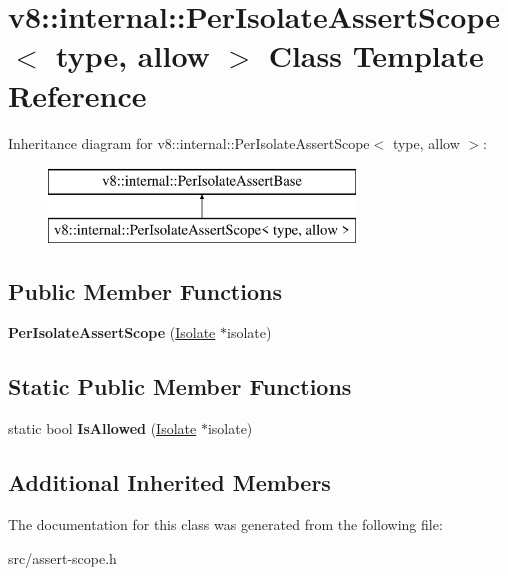 \hypertarget{classv8_1_1internal_1_1_per_isolate_assert_scope}{}\section{v8\+:\+:internal\+:\+:Per\+Isolate\+Assert\+Scope$<$ type, allow $>$ Class Template Reference}
\label{classv8_1_1internal_1_1_per_isolate_assert_scope}
Inheritance diagram for v8\+:\+:internal\+:\+:Per\+Isolate\+Assert\+Scope$<$ type, allow $>$\+:\begin{figure}[H]
\begin{center}
\leavevmode
\includegraphics[height=2.000000cm]{classv8_1_1internal_1_1_per_isolate_assert_scope}
\end{center}
\end{figure}
\subsection*{Public Member Functions}
\begin{DoxyCompactItemize}
\item 
\hypertarget{classv8_1_1internal_1_1_per_isolate_assert_scope_af0f9ff6f8e60581b53a761d8025442a9}{}{\bfseries Per\+Isolate\+Assert\+Scope} (\hyperlink{classv8_1_1internal_1_1_isolate}{Isolate} $\ast$isolate)\label{classv8_1_1internal_1_1_per_isolate_assert_scope_af0f9ff6f8e60581b53a761d8025442a9}

\end{DoxyCompactItemize}
\subsection*{Static Public Member Functions}
\begin{DoxyCompactItemize}
\item 
\hypertarget{classv8_1_1internal_1_1_per_isolate_assert_scope_a757aecdab6d6473a1273216f0df0bb9c}{}static bool {\bfseries Is\+Allowed} (\hyperlink{classv8_1_1internal_1_1_isolate}{Isolate} $\ast$isolate)\label{classv8_1_1internal_1_1_per_isolate_assert_scope_a757aecdab6d6473a1273216f0df0bb9c}

\end{DoxyCompactItemize}
\subsection*{Additional Inherited Members}


The documentation for this class was generated from the following file\+:\begin{DoxyCompactItemize}
\item 
src/assert-\/scope.\+h\end{DoxyCompactItemize}
